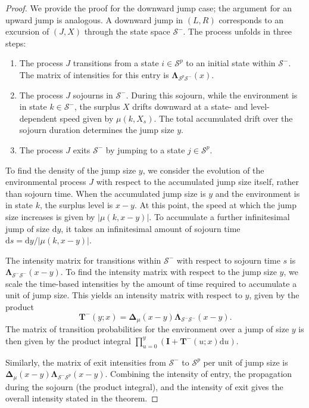 \documentclass[11pt]{article}
\numberwithin{table}{section}
\numberwithin{figure}{section}
\numberwithin{equation}{section}
\newcommand{\dd}{\mathrm{d}}
\newcommand{\1}{{\mathbf 1}}
\newcommand{\0}{\mat{0}}
\begin{document}
\begin{proof}
We provide the proof for the downward jump case; the argument for an upward jump is analogous. A downward jump in \((L,R)\) corresponds to an excursion of \((J,X)\) through the state space \(\mathcal{S}^-\). The process unfolds in three steps:
\begin{enumerate}
    \item The process \(J\) transitions from a state \(i \in \mathcal{S}^p\) to an initial state within \(\mathcal{S}^-\). The matrix of intensities for this entry is \(\bm{\Lambda}_{\mathcal{S}^p\mathcal{S}^-}(x)\).
    \item The process \(J\) sojourns in \(\mathcal{S}^-\). During this sojourn, while the environment is in state \(k \in \mathcal{S}^-\), the surplus \(X\) drifts downward at a state- and level-dependent speed given by \(\mu(k,X_s)\). The total accumulated drift over the sojourn duration determines the jump size \(y\).
    \item The process \(J\) exits \(\mathcal{S}^-\) by jumping to a state \(j \in \mathcal{S}^p\).
\end{enumerate}
To find the density of the jump size \(y\), we consider the evolution of the environmental process \(J\) with respect to the accumulated jump size itself, rather than sojourn time. When the accumulated jump size is \(y\) and the environment is in state \(k\), the surplus level is \(x-y\). At this point, the speed at which the jump size increases is given by \(|\mu(k,x-y)|\). To accumulate a further infinitesimal jump of size \(\dd y\), it takes an infinitesimal amount of sojourn time \(\dd s = \dd y / |\mu(k,x-y)|\).

The intensity matrix for transitions within \(\mathcal{S}^-\) with respect to sojourn time \(s\) is \(\bm{\Lambda}_{\mathcal{S}^-\mathcal{S}^-}(x-y)\). To find the intensity matrix with respect to the jump size \(y\), we scale the time-based intensities by the amount of time required to accumulate a unit of jump size. This yields an intensity matrix with respect to \(y\), given by the product
\[
\bm{T}^-(y;x) = \bm{\Delta}_\mu(x-y) \bm{\Lambda}_{\mathcal{S}^-\mathcal{S}^-}(x-y).
\]
The matrix of transition probabilities for the environment over a jump of size \(y\) is then given by the product integral \(\prod_{u=0}^y (\bm{I} + \bm{T}^-(u;x)\dd u)\).

Similarly, the matrix of exit intensities from \(\mathcal{S}^-\) to \(\mathcal{S}^p\) per unit of jump size is \(\bm{\Delta}_\mu(x-y)\bm{\Lambda}_{\mathcal{S}^-\mathcal{S}^p}(x-y)\). Combining the intensity of entry, the propagation during the sojourn (the product integral), and the intensity of exit gives the overall intensity stated in the theorem.
\end{proof}
\end{document}
